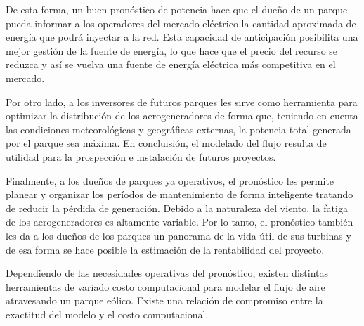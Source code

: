 De esta forma, un buen pronóstico de potencia hace que el dueño de un parque pueda informar a los operadores del mercado eléctrico la cantidad aproximada de energía que podrá inyectar a la red.
Esta capacidad de anticipación posibilita una mejor gestión de la fuente de energía, lo que hace que el precio del recurso se reduzca y así se vuelva una fuente de energía eléctrica más competitiva en el mercado.

Por otro lado, a los inversores de futuros parques les sirve como herramienta para optimizar la distribución de los aerogeneradores
de forma que, teniendo en cuenta las condiciones meteorológicas y geográficas externas,
la potencia total generada por el parque sea máxima. En concluisión, el modelado del flujo resulta de utilidad para la prospección e instalación de futuros proyectos.

Finalmente, a los dueños de parques ya operativos, el pronóstico les permite planear y organizar los períodos de mantenimiento de forma inteligente tratando de reducir la pérdida de generación.
Debido a la naturaleza del viento, la fatiga de los aerogeneradores es altamente variable.
Por lo tanto, el pronóstico también les da a los dueños de los parques un panorama de la vida útil de sus turbinas y de esa forma se hace posible la estimación de la rentabilidad del proyecto.

Dependiendo de las necesidades operativas del pronóstico, existen distintas herramientas de variado costo computacional para modelar el flujo de aire atravesando un parque eólico.
Existe una relación de compromiso entre la exactitud del modelo y el costo computacional.
